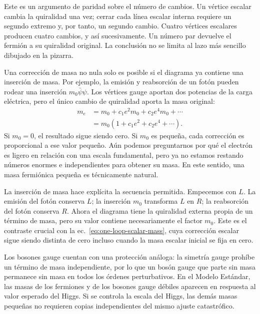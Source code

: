 Este es un argumento de paridad sobre el número de cambios. Un vértice escalar cambia la quiralidad una vez; cerrar cada línea escalar interna requiere un segundo extremo y, por tanto, un segundo cambio. Cuatro vértices escalares producen cuatro cambios, y así sucesivamente. Un número par devuelve el fermión a su quiralidad original. La conclusión no se limita al lazo más sencillo dibujado en la pizarra.

Una corrección de masa no nula solo es posible si el diagrama ya contiene una inserción de masa. Por ejemplo, la emisión y reabsorción de un fotón pueden rodear una inserción \(m_0\bar\psi\psi\). Los vértices gauge aportan dos potencias de la carga eléctrica, pero el único cambio de quiralidad aporta la masa original:
\begin{equation}
\begin{aligned}
m_e
&=m_0+c_1e^2m_0+c_2e^4m_0+\cdots\\
&=m_0\left(1+c_1e^2+c_2e^4+\cdots\right).
\end{aligned}
\label{eq:multiplicative-fermion-mass}
\end{equation}
Si \(m_0=0\), el resultado sigue siendo cero. Si \(m_0\) es pequeña, cada corrección es proporcional a ese valor pequeño. Aún podemos preguntarnos por qué el electrón es ligero en relación con una escala fundamental, pero ya no estamos restando números enormes e independientes para obtener su masa. En este sentido, una masa fermiónica pequeña es técnicamente natural.

La inserción de masa hace explícita la secuencia permitida. Empecemos con \(L\). La emisión del fotón conserva \(L\); la inserción \(m_0\) transforma \(L\) en \(R\); la reabsorción del fotón conserva \(R\). Ahora el diagrama tiene la quiralidad externa propia de un término de masa, pero su valor contiene necesariamente el factor \(m_0\). Este es el contraste crucial con la ec.~\eqref{eq:one-loop-scalar-mass}, cuya corrección escalar sigue siendo distinta de cero incluso cuando la masa escalar inicial se fija en cero.

Los bosones gauge cuentan con una protección análoga: la simetría gauge prohíbe un término de masa independiente, por lo que un bosón gauge que parte sin masa permanece sin masa en todos los órdenes perturbativos. En el Modelo Estándar, las masas de los fermiones y de los bosones gauge débiles aparecen en respuesta al valor esperado del Higgs. Si se controla la escala del Higgs, las demás masas pequeñas no requieren copias independientes del mismo ajuste catastrófico.

